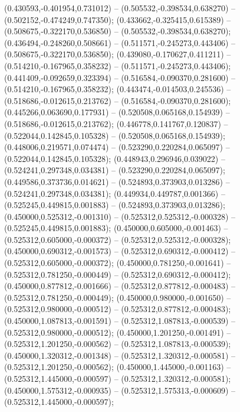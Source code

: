  (0.430593,-0.401954,0.731012) -- (0.505532,-0.398534,0.638270) -- (0.502152,-0.474249,0.747350);
 (0.433662,-0.325415,0.615389) -- (0.508675,-0.322170,0.536850) -- (0.505532,-0.398534,0.638270);
 (0.436494,-0.248260,0.508661) -- (0.511571,-0.245273,0.443406) -- (0.508675,-0.322170,0.536850);
 (0.439080,-0.170627,0.411211) -- (0.514210,-0.167965,0.358232) -- (0.511571,-0.245273,0.443406);
 (0.441409,-0.092659,0.323394) -- (0.516584,-0.090370,0.281600) -- (0.514210,-0.167965,0.358232);
 (0.443474,-0.014503,0.245536) -- (0.518686,-0.012615,0.213762) -- (0.516584,-0.090370,0.281600);
 (0.445266,0.063690,0.177931) -- (0.520508,0.065168,0.154939) -- (0.518686,-0.012615,0.213762);
 (0.446778,0.141767,0.120837) -- (0.522044,0.142845,0.105328) -- (0.520508,0.065168,0.154939);
 (0.448006,0.219571,0.074474) -- (0.523290,0.220284,0.065097) -- (0.522044,0.142845,0.105328);
 (0.448943,0.296946,0.039022) -- (0.524241,0.297348,0.034381) -- (0.523290,0.220284,0.065097);
 (0.449586,0.373736,0.014621) -- (0.524893,0.373903,0.013286) -- (0.524241,0.297348,0.034381);
 (0.449934,0.449787,0.001366) -- (0.525245,0.449815,0.001883) -- (0.524893,0.373903,0.013286);
 (0.450000,0.525312,-0.001310) -- (0.525312,0.525312,-0.000328) -- (0.525245,0.449815,0.001883);
 (0.450000,0.605000,-0.001463) -- (0.525312,0.605000,-0.000372) -- (0.525312,0.525312,-0.000328);
 (0.450000,0.690312,-0.001573) -- (0.525312,0.690312,-0.000412) -- (0.525312,0.605000,-0.000372);
 (0.450000,0.781250,-0.001641) -- (0.525312,0.781250,-0.000449) -- (0.525312,0.690312,-0.000412);
 (0.450000,0.877812,-0.001666) -- (0.525312,0.877812,-0.000483) -- (0.525312,0.781250,-0.000449);
 (0.450000,0.980000,-0.001650) -- (0.525312,0.980000,-0.000512) -- (0.525312,0.877812,-0.000483);
 (0.450000,1.087813,-0.001591) -- (0.525312,1.087813,-0.000539) -- (0.525312,0.980000,-0.000512);
 (0.450000,1.201250,-0.001491) -- (0.525312,1.201250,-0.000562) -- (0.525312,1.087813,-0.000539);
 (0.450000,1.320312,-0.001348) -- (0.525312,1.320312,-0.000581) -- (0.525312,1.201250,-0.000562);
 (0.450000,1.445000,-0.001163) -- (0.525312,1.445000,-0.000597) -- (0.525312,1.320312,-0.000581);
 (0.450000,1.575312,-0.000935) -- (0.525312,1.575313,-0.000609) -- (0.525312,1.445000,-0.000597);
